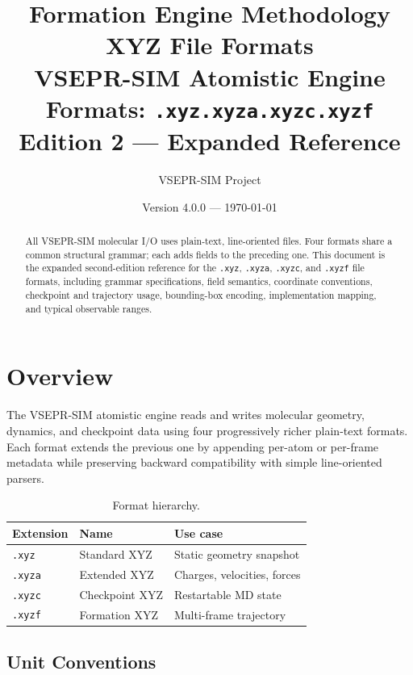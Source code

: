 \documentclass[12pt, a4paper, oneside]{article}
\title{%
  \textbf{Formation Engine Methodology}\\[6pt]
  \textbf{XYZ File Formats}\\[10pt]
  \large VSEPR-SIM Atomistic Engine\\
  Formats: \texttt{.xyz}\quad\texttt{.xyza}\quad\texttt{.xyzc}\quad\texttt{.xyzf}\\[4pt]
  \normalsize Edition 2 --- Expanded Reference
}
\author{VSEPR-SIM Project}
\date{Version 4.0.0 --- \today}
\begin{document}
\maketitle

\begin{abstract}
All VSEPR-SIM molecular I/O uses plain-text, line-oriented files.
Four formats share a common structural grammar; each adds fields to
the preceding one.  This document is the expanded second-edition
reference for the \texttt{.xyz}, \texttt{.xyza}, \texttt{.xyzc}, and
\texttt{.xyzf} file formats, including grammar specifications, field
semantics, coordinate conventions, checkpoint and trajectory usage,
bounding-box encoding, implementation mapping, and typical observable
ranges.
\end{abstract}

\tableofcontents
\newpage

\section{Overview}

The VSEPR-SIM atomistic engine reads and writes molecular geometry,
dynamics, and checkpoint data using four progressively richer
plain-text formats.  Each format extends the previous one by appending
per-atom or per-frame metadata while preserving backward compatibility
with simple line-oriented parsers.

\begin{table}[htbp]
  \centering
  \caption{Format hierarchy.}
  \label{tab:hierarchy}
  \begin{tabular}{llp{8cm}}
    \toprule
    Extension & Name & Use case \\
    \midrule
    \texttt{.xyz}  & Standard XYZ     & Static geometry snapshot \\
    \texttt{.xyza} & Extended XYZ     & Charges, velocities, forces \\
    \texttt{.xyzc} & Checkpoint XYZ   & Restartable MD state \\
    \texttt{.xyzf} & Formation XYZ    & Multi-frame trajectory \\
    \bottomrule
  \end{tabular}
\end{table}

\subsection{Unit Conventions}
\end{document}
